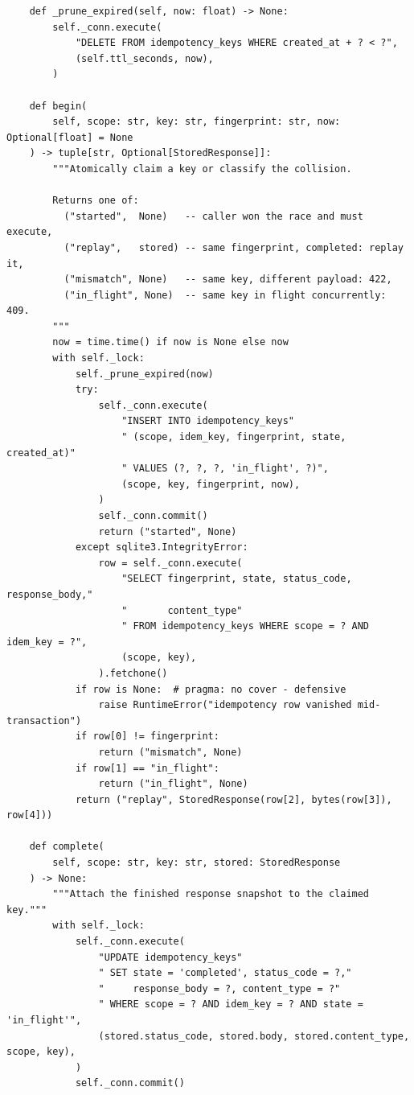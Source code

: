 \begin{verbatim}
    def _prune_expired(self, now: float) -> None:
        self._conn.execute(
            "DELETE FROM idempotency_keys WHERE created_at + ? < ?",
            (self.ttl_seconds, now),
        )

    def begin(
        self, scope: str, key: str, fingerprint: str, now: Optional[float] = None
    ) -> tuple[str, Optional[StoredResponse]]:
        """Atomically claim a key or classify the collision.

        Returns one of:
          ("started",  None)   -- caller won the race and must execute,
          ("replay",   stored) -- same fingerprint, completed: replay it,
          ("mismatch", None)   -- same key, different payload: 422,
          ("in_flight", None)  -- same key in flight concurrently: 409.
        """
        now = time.time() if now is None else now
        with self._lock:
            self._prune_expired(now)
            try:
                self._conn.execute(
                    "INSERT INTO idempotency_keys"
                    " (scope, idem_key, fingerprint, state, created_at)"
                    " VALUES (?, ?, ?, 'in_flight', ?)",
                    (scope, key, fingerprint, now),
                )
                self._conn.commit()
                return ("started", None)
            except sqlite3.IntegrityError:
                row = self._conn.execute(
                    "SELECT fingerprint, state, status_code, response_body,"
                    "       content_type"
                    " FROM idempotency_keys WHERE scope = ? AND idem_key = ?",
                    (scope, key),
                ).fetchone()
            if row is None:  # pragma: no cover - defensive
                raise RuntimeError("idempotency row vanished mid-transaction")
            if row[0] != fingerprint:
                return ("mismatch", None)
            if row[1] == "in_flight":
                return ("in_flight", None)
            return ("replay", StoredResponse(row[2], bytes(row[3]), row[4]))

    def complete(
        self, scope: str, key: str, stored: StoredResponse
    ) -> None:
        """Attach the finished response snapshot to the claimed key."""
        with self._lock:
            self._conn.execute(
                "UPDATE idempotency_keys"
                " SET state = 'completed', status_code = ?,"
                "     response_body = ?, content_type = ?"
                " WHERE scope = ? AND idem_key = ? AND state = 'in_flight'",
                (stored.status_code, stored.body, stored.content_type, scope, key),
            )
            self._conn.commit()


\end{verbatim}
